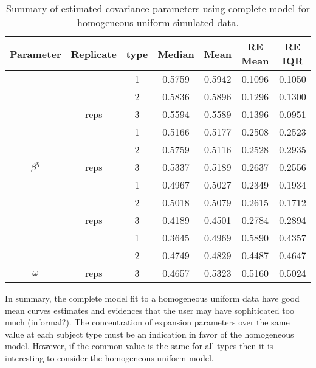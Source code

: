 \begin{table}[b]\centering
\caption{Summary of estimated covariance parameters using complete model for homogeneous uniform simulated data.}
\begin{knitrout}
\color{fgcolor}
\begin{tabular}{ccccccc}
\toprule
Parameter & Replicate & type & Median & Mean & RE Mean & RE IQR\\
\midrule
 &  & 1 & 0.5759 & 0.5942 & 0.1096 & 0.1050\\

 &  & 2 & 0.5836 & 0.5896 & 0.1296 & 0.1300\\

 & \multirow{-3}{*}{\centering\arraybackslash 30 reps} & 3 & 0.5594 & 0.5589 & 0.1396 & 0.0951\\
\cmidrule{2-7}
 &  & 1 & 0.5166 & 0.5177 & 0.2508 & 0.2523\\

 &  & 2 & 0.5759 & 0.5116 & 0.2528 & 0.2935\\

\multirow{-6}{*}{\centering\arraybackslash $\beta^\eta$} & \multirow{-3}{*}{\centering\arraybackslash 5 reps} & 3 & 0.5337 & 0.5189 & 0.2637 & 0.2556\\
\cmidrule{1-7}
 &  & 1 & 0.4967 & 0.5027 & 0.2349 & 0.1934\\

 &  & 2 & 0.5018 & 0.5079 & 0.2615 & 0.1712\\

 & \multirow{-3}{*}{\centering\arraybackslash 30 reps} & 3 & 0.4189 & 0.4501 & 0.2784 & 0.2894\\
\cmidrule{2-7}
 &  & 1 & 0.3645 & 0.4969 & 0.5890 & 0.4357\\

 &  & 2 & 0.4749 & 0.4829 & 0.4487 & 0.4647\\

\multirow{-6}{*}{\centering\arraybackslash $\omega$} & \multirow{-3}{*}{\centering\arraybackslash 5 reps} & 3 & 0.4657 & 0.5323 & 0.5160 & 0.5024\\
\bottomrule
\end{tabular}


\end{knitrout}
\label{tab:par-hu2comp}
\end{table}

In summary, the complete model fit to a homogeneous uniform data have good mean curves estimates and evidences that the user may have sophiticated too much (informal?). The concentration of expansion parameters over the same value at each subject type must be an indication in favor of the homogeneous model. However, if the common value is the same for all types then it is interesting to consider the homogeneous uniform model. 



